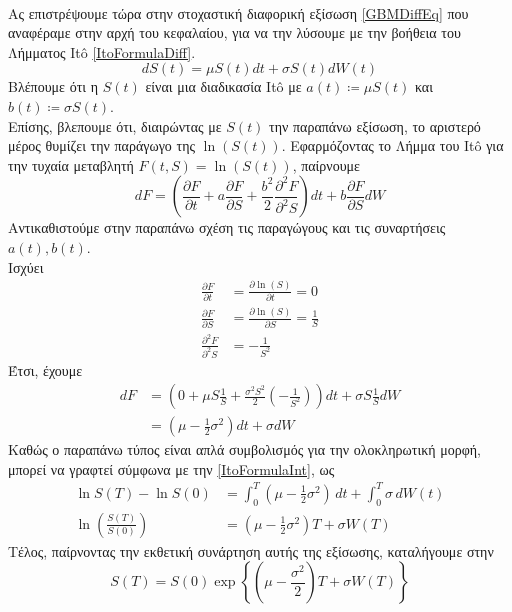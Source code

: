 \documentclass[12pt,a4paper,twoside,openany]{book}
\begin{document}
	\vspace{4.5mm}\\
	Ας επιστρέψουμε τώρα στην στοχαστική διαφορική εξίσωση \eqref{GBMDiffEq} που αναφέραμε στην αρχή του κεφαλαίου, για να την λύσουμε με την βοήθεια του Λήμματος Itô \eqref{ItoFormulaDiff}.
 	\[dS(t)= \mu S(t)dt + \sigma S(t)dW(t)\]
 	Βλέπουμε ότι η $S(t)$ είναι μια διαδικασία Itô με $a(t)\coloneqq \mu S(t)$ και $b(t)\coloneqq \sigma S(t)$.\\
 	Επίσης, βλεπουμε ότι, διαιρώντας με $S(t)$ την παραπάνω εξίσωση, το αριστερό μέρος θυμίζει την παράγωγο της $\ln(S(t))$. Εφαρμόζοντας το Λήμμα του Itô για την τυχαία μεταβλητή $F(t,S)= \ln(S(t))$, παίρνουμε
 	\[dF= \left(\frac{\partial F}{\partial t} +a\frac{\partial F}{\partial S} + \frac{b^2}{2}\frac{\partial^2 F}{\partial^2 S} \right)dt
 	+ b\frac{\partial F}{\partial S}dW \]
 	\allowdisplaybreaks
 	Αντικαθιστούμε στην παραπάνω σχέση τις παραγώγους και τις συναρτήσεις $a(t),b(t)$. \\Ισχύει
 	\begin{align*}
 		\frac{\partial F}{\partial t} &= \frac{\partial\ln(S) }{\partial t} = 0 \\
 		\frac{\partial F}{\partial S} &= \frac{\partial\ln(S) }{\partial S} = \frac{1}{S} \\
 		\frac{\partial^2 F}{\partial^2 S} &= -\frac{1}{S^2}
 	\end{align*}
 	Έτσι, έχουμε
 	\begin{align*}
 		dF &= \left(0 +\mu S\frac{1}{S} + \frac{\sigma^2 S^2}{2}\left(-\frac{1}{S^2} \right) \right)dt + \sigma S \frac{1}{S}dW \\
 		&= \left(\mu - \frac{1}{2}\sigma^2\right)dt + \sigma dW
 	\end{align*}
  	Καθώς ο παραπάνω τύπος είναι απλά συμβολισμός για την ολοκληρωτική μορφή, μπορεί να γραφτεί σύμφωνα με την \eqref{ItoFormulaInt}, ως
  	\begin{align*}
  		\ln S(T) - \ln S(0) &= \int_{0}^{T}\left(\mu - \frac{1}{2}\sigma^2\right)\, dt + \int_{0}^{T}\sigma\, dW(t) \\
  		\ln(\frac{S(T)}{S(0)}) &= \left(\mu - \frac{1}{2}\sigma^2\right)T + \sigma W(T)
  	\end{align*}
  	\allowdisplaybreaks[0]
  	Τέλος, παίρνοντας την εκθετική συνάρτηση αυτής της εξίσωσης, καταλήγουμε στην
  	\[S(T)= S(0)\exp\left\{ \left(\mu-\frac{\sigma^2}{2}\right)T +\sigma W(T)\right\} \]
  	
\end{document}

